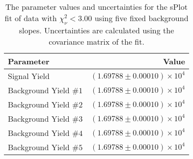 
\begin{table}[ht]
    \begin{center}
        \begin{tabular}{lr}\toprule
            Parameter & Value \\\midrule
            Signal Yield & $(1.69788 \pm 0.00010) \times 10^{4}$ \\
            Background Yield $\#1$ & $(1.69788 \pm 0.00010) \times 10^{4}$ \\
            Background Yield $\#2$ & $(1.69788 \pm 0.00010) \times 10^{4}$ \\
            Background Yield $\#3$ & $(1.69788 \pm 0.00010) \times 10^{4}$ \\
            Background Yield $\#4$ & $(1.69788 \pm 0.00010) \times 10^{4}$ \\
            Background Yield $\#5$ & $(1.69788 \pm 0.00010) \times 10^{4}$ \\\bottomrule
        \end{tabular}
        \caption{The parameter values and uncertainties for the sPlot fit of data with $\chi^2_\nu < 3.00$ using five fixed background slopes. Uncertainties are calculated using the covariance matrix of the fit.}\label{tab:splot-fit-results-chisqdof-3.00-fixed-5}
    \end{center}
\end{table}
